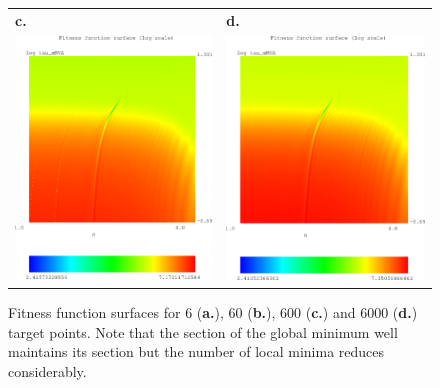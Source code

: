 \documentclass[a4paper, 11pt]{article}
\begin{document}
\begin{figure}
\begin{center}
\begin{tabular}{cc}
        \multicolumn{1}{l}{\mbox{\bf c.}} & \multicolumn{1}{l}{\mbox{\bf d.}} \\
        \includegraphics[bb=120 300 500 660,clip,width=.6\linewidth]{figures/600repressilator.eps}&\includegraphics[bb=120 300 500 660,clip,width=.6\linewidth]{figures/6000repressilator.eps}\\
        \end{tabular}
      \caption{Fitness function surfaces for 6 ({\bf a.}), 60 ({\bf b.}), 600 ({\bf c.}) and 6000 ({\bf d.}) target points. 
        Note that the section of the global minimum well maintains its section but the number of local minima reduces considerably.
        \label{surfaceComparison}}
    \end{center}
  \end{figure}
\end{document}

